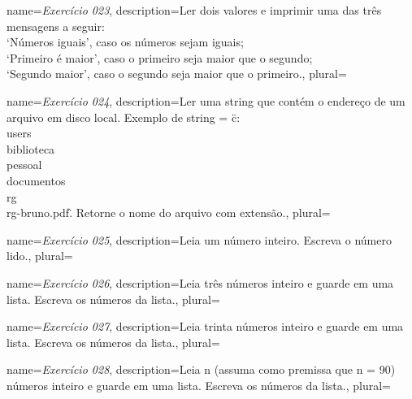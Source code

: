 {
	name={\textit{Exercício 023}},
	description={Ler dois valores e imprimir uma das três mensagens a seguir:\\
		‘Números iguais’, caso os números sejam iguais;\\
		‘Primeiro é maior’, caso o primeiro seja maior que o segundo;\\
		‘Segundo maior’, caso o segundo seja maior que o primeiro.},
	plural={}
}


{
	name={\textit{Exercício 024}},
	description={Ler uma string que contém o endereço de um arquivo em disco local. Exemplo de string = \"c:\\users\\biblioteca\\pessoal\\documentos\\rg\\rg-bruno.pdf\". Retorne o nome do arquivo com extensão.},
	plural={}
}


{
	name={\textit{Exercício 025}},
	description={Leia um número inteiro. Escreva o número lido.},
	plural={}
}

{
	name={\textit{Exercício 026}},
	description={Leia três números inteiro e guarde em uma lista. Escreva os números da lista.},
	plural={}
}


{
	name={\textit{Exercício 027}},
	description={Leia trinta números inteiro e guarde em uma lista. Escreva os números da lista.},
	plural={}
}


{
	name={\textit{Exercício 028}},
	description={Leia n (assuma como premissa que n = 90) números inteiro e guarde em uma lista. Escreva os números da lista.},
	plural={}
}


